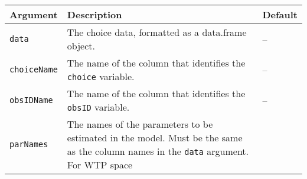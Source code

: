 \documentclass[article]{jss}
\begin{document}
\begin{longtable}[]{@{}lll@{}}
\toprule
\begin{minipage}[b]{0.14\columnwidth}\raggedright
Argument\strut
\end{minipage} & \begin{minipage}[b]{0.66\columnwidth}\raggedright
Description\strut
\end{minipage} & \begin{minipage}[b]{0.11\columnwidth}\raggedright
Default\strut
\end{minipage}\tabularnewline
\midrule
\endhead
\begin{minipage}[t]{0.14\columnwidth}\raggedright
\texttt{data}\strut
\end{minipage} & \begin{minipage}[t]{0.66\columnwidth}\raggedright
The choice data, formatted as a data.frame object.\strut
\end{minipage} & \begin{minipage}[t]{0.11\columnwidth}\raggedright
--\strut
\end{minipage}\tabularnewline
\begin{minipage}[t]{0.14\columnwidth}\raggedright
\texttt{choiceName}\strut
\end{minipage} & \begin{minipage}[t]{0.66\columnwidth}\raggedright
The name of the column that identifies the \texttt{choice}
variable.\strut
\end{minipage} & \begin{minipage}[t]{0.11\columnwidth}\raggedright
--\strut
\end{minipage}\tabularnewline
\begin{minipage}[t]{0.14\columnwidth}\raggedright
\texttt{obsIDName}\strut
\end{minipage} & \begin{minipage}[t]{0.66\columnwidth}\raggedright
The name of the column that identifies the \texttt{obsID}
variable.\strut
\end{minipage} & \begin{minipage}[t]{0.11\columnwidth}\raggedright
--\strut
\end{minipage}\tabularnewline
\begin{minipage}[t]{0.14\columnwidth}\raggedright
\texttt{parNames}\strut
\end{minipage} & \begin{minipage}[t]{0.66\columnwidth}\raggedright
The names of the parameters to be estimated in the model. Must be the
same as the column names in the \texttt{data} argument. For WTP space

\end{minipage}
\end{longtable}
\end{document}
